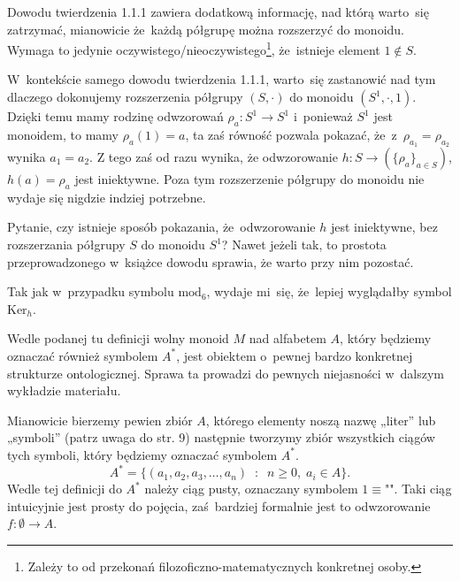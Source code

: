 \documentclass[a4paper,11pt]{article}
\begin{document}
\start {} Dowodu twierdzenia 1.1.1 zawiera dodatkową informację,
nad którą warto~się zatrzymać, mianowicie że~każdą półgrupę można
rozszerzyć do monoidu. Wymaga to jedynie
oczywistego/nieoczywistego\footnote{Zależy to od przekonań
  filozoficzno-matematycznych konkretnej osoby.}, że~istnieje element
$1 \notin S$.

W~kontekście samego dowodu twierdzenia 1.1.1, warto~się zastanowić nad
tym dlaczego dokonujemy rozszerzenia półgrupy $( S, \cdot )$ do
monoidu $( S^{ 1 }, \cdot, 1 )$. Dzięki temu mamy rodzinę odwzorowań
$\rho_{ a } : S^{ 1 } \to S^{ 1 }$ i~ponieważ $S^{ 1 }$ jest monoidem,
to mamy $\rho_{ a }( 1 ) = a$, ta zaś równość pozwala pokazać,
że~z~$\rho_{ a_{ 1 } } = \rho_{ a_{ 2 } }$ wynika $a_{ 1 } = a_{ 2 }$.
Z tego zaś od razu wynika, że odwzorowanie
$h : S \to ( \{ \rho_{ a } \}_{ a \in S } )$, $h( a ) = \rho_{ a }$
jest iniektywne. Poza tym rozszerzenie półgrupy do monoidu nie wydaje
się nigdzie indziej potrzebne.

Pytanie, czy istnieje sposób pokazania, że~odwzorowanie $h$ jest
iniektywne, bez rozszerzania półgrupy $S$ do monoidu $S^{ 1 }$? Nawet
jeżeli tak, to prostota przeprowadzonego w~książce dowodu sprawia, że
warto przy nim pozostać.

\vspace{\spaceFour}



\start {} Tak jak w~przypadku symbolu $\textrm{mod}_{ 6 }$,
wydaje mi~się, że~lepiej wyglądałby symbol $\textrm{Ker}_{ h }$.

\vspace{\spaceFour}



\start {} Wedle podanej tu definicji wolny monoid $M$ nad
alfabetem $A$, który będziemy oznaczać również symbolem $A^{ * }$,
jest obiektem o~pewnej bardzo konkretnej strukturze ontologicznej.
Sprawa ta prowadzi do pewnych niejasności w~dalszym wykładzie materiału.

Mianowicie bierzemy pewien zbiór $A$, którego elementy noszą nazwę „liter” lub „symboli” (patrz uwaga do str. 9) następnie tworzymy zbiór wszystkich ciągów tych symboli, który będziemy oznaczać symbolem $A^{ * }$.
\begin{equation}
  \label{eq:Forys-Forys-02}
  A^{ * } =
  \{ ( a_{ 1 }, a_{ 2 }, a_{ 3 }, \ldots, a_{ n } ) \;\; : \;\; n \geq 0, \;
  a_{ i } \in A \}.
\end{equation}
Wedle tej definicji do $A^{ * }$ należy ciąg pusty, oznaczany symbolem
$1 \equiv \textrm{""}$. Taki ciąg intuicyjnie jest prosty do pojęcia,
zaś~bardziej formalnie jest to odwzorowanie $f : \emptyset \to A$.
\end{document}
